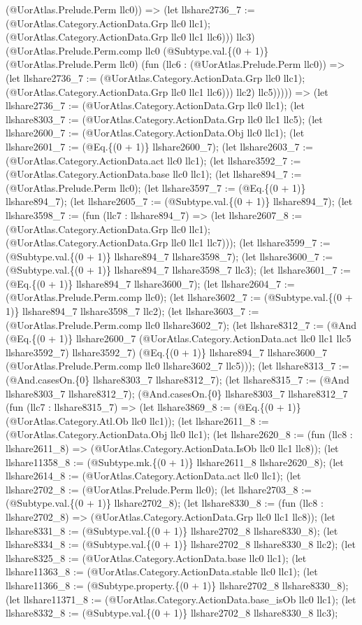 \documentclass[11pt]{article}
\begin{document}
(@UorAtlas.Prelude.Perm llc0)) => (let llshare2736\_7 := (@UorAtlas.Category.ActionData.Grp llc0 llc1); (@UorAtlas.Category.ActionData.Grp llc0 llc1 llc6))) llc3) (@UorAtlas.Prelude.Perm.comp llc0 (@Subtype.val.\{(0 + 1)\} (@UorAtlas.Prelude.Perm llc0) (fun (llc6 : (@UorAtlas.Prelude.Perm llc0)) => (let llshare2736\_7 := (@UorAtlas.Category.ActionData.Grp llc0 llc1); (@UorAtlas.Category.ActionData.Grp llc0 llc1 llc6))) llc2) llc5))))) => (let llshare2736\_7 := (@UorAtlas.Category.ActionData.Grp llc0 llc1); (let llshare8303\_7 := (@UorAtlas.Category.ActionData.Grp llc0 llc1 llc5); (let llshare2600\_7 := (@UorAtlas.Category.ActionData.Obj llc0 llc1); (let llshare2601\_7 := (@Eq.\{(0 + 1)\} llshare2600\_7); (let llshare2603\_7 := (@UorAtlas.Category.ActionData.act llc0 llc1); (let llshare3592\_7 := (@UorAtlas.Category.ActionData.base llc0 llc1); (let llshare894\_7 := (@UorAtlas.Prelude.Perm llc0); (let llshare3597\_7 := (@Eq.\{(0 + 1)\} llshare894\_7); (let llshare2605\_7 := (@Subtype.val.\{(0 + 1)\} llshare894\_7); (let llshare3598\_7 := (fun (llc7 : llshare894\_7) => (let llshare2607\_8 := (@UorAtlas.Category.ActionData.Grp llc0 llc1); (@UorAtlas.Category.ActionData.Grp llc0 llc1 llc7))); (let llshare3599\_7 := (@Subtype.val.\{(0 + 1)\} llshare894\_7 llshare3598\_7); (let llshare3600\_7 := (@Subtype.val.\{(0 + 1)\} llshare894\_7 llshare3598\_7 llc3); (let llshare3601\_7 := (@Eq.\{(0 + 1)\} llshare894\_7 llshare3600\_7); (let llshare2604\_7 := (@UorAtlas.Prelude.Perm.comp llc0); (let llshare3602\_7 := (@Subtype.val.\{(0 + 1)\} llshare894\_7 llshare3598\_7 llc2); (let llshare3603\_7 := (@UorAtlas.Prelude.Perm.comp llc0 llshare3602\_7); (let llshare8312\_7 := (@And (@Eq.\{(0 + 1)\} llshare2600\_7 (@UorAtlas.Category.ActionData.act llc0 llc1 llc5 llshare3592\_7) llshare3592\_7) (@Eq.\{(0 + 1)\} llshare894\_7 llshare3600\_7 (@UorAtlas.Prelude.Perm.comp llc0 llshare3602\_7 llc5))); (let llshare8313\_7 := (@And.casesOn.\{0\} llshare8303\_7 llshare8312\_7); (let llshare8315\_7 := (@And llshare8303\_7 llshare8312\_7); (@And.casesOn.\{0\} llshare8303\_7 llshare8312\_7 (fun (llc7 : llshare8315\_7) => (let llshare3869\_8 := (@Eq.\{(0 + 1)\} (@UorAtlas.Category.Atl.Ob llc0 llc1)); (let llshare2611\_8 := (@UorAtlas.Category.ActionData.Obj llc0 llc1); (let llshare2620\_8 := (fun (llc8 : llshare2611\_8) => (@UorAtlas.Category.ActionData.IsOb llc0 llc1 llc8)); (let llshare11358\_8 := (@Subtype.mk.\{(0 + 1)\} llshare2611\_8 llshare2620\_8); (let llshare2614\_8 := (@UorAtlas.Category.ActionData.act llc0 llc1); (let llshare2702\_8 := (@UorAtlas.Prelude.Perm llc0); (let llshare2703\_8 := (@Subtype.val.\{(0 + 1)\} llshare2702\_8); (let llshare8330\_8 := (fun (llc8 : llshare2702\_8) => (@UorAtlas.Category.ActionData.Grp llc0 llc1 llc8)); (let llshare8331\_8 := (@Subtype.val.\{(0 + 1)\} llshare2702\_8 llshare8330\_8); (let llshare8334\_8 := (@Subtype.val.\{(0 + 1)\} llshare2702\_8 llshare8330\_8 llc2); (let llshare8325\_8 := (@UorAtlas.Category.ActionData.base llc0 llc1); (let llshare11363\_8 := (@UorAtlas.Category.ActionData.stable llc0 llc1); (let llshare11366\_8 := (@Subtype.property.\{(0 + 1)\} llshare2702\_8 llshare8330\_8); (let llshare11371\_8 := (@UorAtlas.Category.ActionData.base\_isOb llc0 llc1); (let llshare8332\_8 := (@Subtype.val.\{(0 + 1)\} llshare2702\_8 llshare8330\_8 llc3); 
\end{document}

